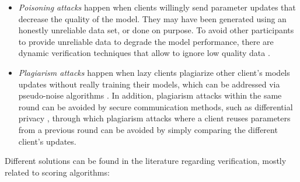 \begin{itemize}
    \item \textit{Poisoning attacks} happen when clients willingly send parameter updates that decrease the quality of the model. They may have been generated using an honestly unreliable data set, or done on purpose. To avoid other participants to provide unreliable data to degrade the model performance, there are dynamic verification techniques that allow to ignore low quality data \cite{10.48550/arxiv.2110.02182, 10.48550/arxiv.2104.10501}.
    
    \item \textit{Plagiarism attacks} happen when lazy clients plagiarize other client's models updates without really training their models, which can be addressed via pseudo-noise algorithms \cite{9403374}. In addition, plagiarism attacks within the same round can be avoided by secure communication methods, such as differential privacy \cite{10.48550/arxiv.2009.09338}, through which plagiarism attacks where a client reuses parameters from a previous round can be avoided by simply comparing the different client's updates.
\end{itemize}

Different solutions can be found in the literature regarding verification, mostly related to scoring algorithms:

